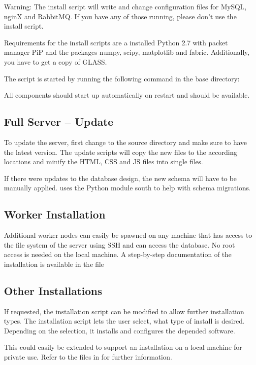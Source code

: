 Warning: The install script will write and change configuration files for MySQL, nginX and RabbitMQ.
If you have any of those running, please don't use the install script.

Requirements for the install scripts are a installed Python 2.7 with packet manager PiP and the packages numpy, scipy, matplotlib and fabric.
Additionally, you have to get a copy of GLASS.

The script is started by running the following command in the base directory:

All components should start up automatically on restart and \spl should be available.


\subsection{Full Server -- Update}

To update the server, first change to the source directory and make sure to have the latest version.
The update scripts will copy the new files to the according locations and minify the HTML, CSS and JS files into single files.

If there were updates to the database design, the new schema will have to be manually applied.
\spl uses the Python module south to help with schema migrations.


\subsection{Worker Installation}
\label{sec:workerinstall}

Additional worker nodes can easily be spawned on any machine that has access to the file system of the server using SSH and can access the database.
No root access is needed on the local machine.
A step-by-step documentation of the installation is available in the file 



\subsection{Other Installations}
If requested, the installation script can be modified to allow further installation types.
The installation script lets the user select, what type of install is desired.
Depending on the selection, it installs and configures the depended software.

This could easily be extended to support an installation on a local machine for private use.
Refer to the files in  for further information.

